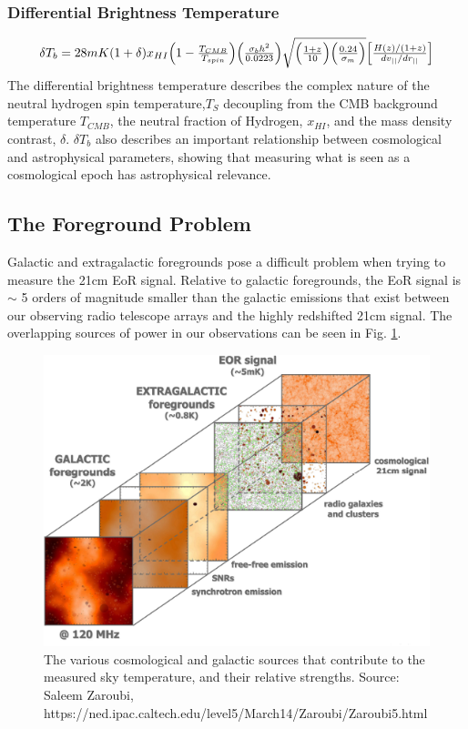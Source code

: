 \documentclass[a0,landscape]{a0poster}
\begin{document}
\begin{multicols}{4}
\subsubsection*{Differential Brightness Temperature}
\begin{equation}
\label{difftemp}
\resizebox{.9\hsize}{!}{$
\delta T_{b} = 28mK(1+\delta)x_{HI}\Big(1-\frac{T_{CMB}}{T_{spin}}\Big)\Big(\frac{\sigma_{b}h^2}{0.0223}\Big)\sqrt{\Big(\frac{1+z}{10}\Big)\Big(\frac{0.24}{\sigma_m}\Big)}\Big[ \frac{H(z)/(1+z)}{dv_{||}/dr_{||}}\Big]$}
\end{equation}
The differential brightness temperature describes the complex nature of the neutral hydrogen spin temperature,$T_S$ decoupling from the CMB background temperature $T_{CMB}$, the neutral fraction of Hydrogen, $x_{HI}$, and the mass density contrast, $\delta$.
$\delta T_b$ also describes an important relationship between cosmological and astrophysical parameters, showing that measuring what is seen as a cosmological epoch has astrophysical relevance. 


\color{DarkSlateGray} %
\subsection*{The Foreground Problem}
Galactic and extragalactic foregrounds pose a difficult problem when trying to measure the 21cm EoR signal. Relative to galactic foregrounds, the EoR signal is $\sim$ 5 orders of magnitude smaller than the galactic emissions that exist between our observing radio telescope arrays and the highly redshifted 21cm signal. The overlapping sources of power in our observations can be seen in Fig. \ref{foregroundsrcs}.


\begin{figure}[H]
\centering
\label{foregroundsrcs}
\includegraphics[width=0.55\linewidth]{figures/foreground_figure.png}
\caption{The various cosmological and galactic sources that contribute to the measured sky temperature, and their relative strengths. Source: Saleem Zaroubi, https://ned.ipac.caltech.edu/level5/March14/Zaroubi/Zaroubi5.html}
\end{figure}


\end{multicols}
\end{document}
